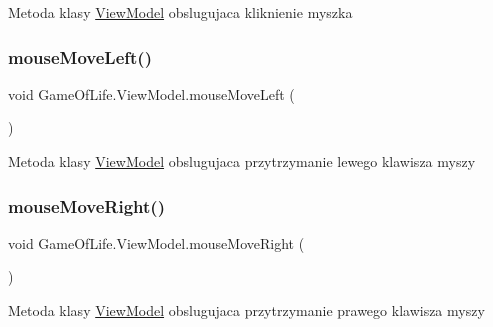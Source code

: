 Metoda klasy \mbox{\hyperlink{class_game_of_life_1_1_view_model}{View\+Model}} obslugujaca kliknienie myszka 

\mbox{\label{class_game_of_life_1_1_view_model_a81dfc0f6d9955ac237f39a79ed6d071a}} 
\subsubsection{\texorpdfstring{mouseMoveLeft()}{mouseMoveLeft()}}
{\footnotesize\ttfamily void Game\+Of\+Life.\+View\+Model.\+mouse\+Move\+Left (\begin{DoxyParamCaption}{ }\end{DoxyParamCaption})\hspace{0.3cm}{\ttfamily [inline]}}



Metoda klasy \mbox{\hyperlink{class_game_of_life_1_1_view_model}{View\+Model}} obslugujaca przytrzymanie lewego klawisza myszy 

\mbox{\label{class_game_of_life_1_1_view_model_a3640ee71bf2210d1205725acc4f8180f}} 
\subsubsection{\texorpdfstring{mouseMoveRight()}{mouseMoveRight()}}
{\footnotesize\ttfamily void Game\+Of\+Life.\+View\+Model.\+mouse\+Move\+Right (\begin{DoxyParamCaption}{ }\end{DoxyParamCaption})\hspace{0.3cm}{\ttfamily [inline]}}



Metoda klasy \mbox{\hyperlink{class_game_of_life_1_1_view_model}{View\+Model}} obslugujaca przytrzymanie prawego klawisza myszy 

\mbox{\label{class_game_of_life_1_1_view_model_a60b920b1e886ffdb2920d587331bc78a}} 
